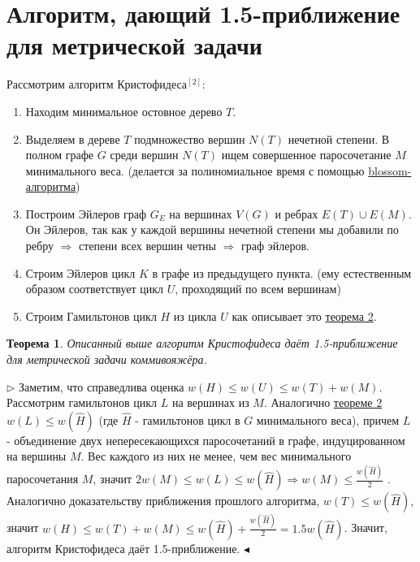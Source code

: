 \documentclass[14pt]{article}
\newtheorem{Th}{Теорема}
\newenvironment{PROOF}
{\par\noindent{\bf Доказательство:}\newline$\triangleright$}
{\hfill$\scriptstyle\blacktriangleleft$}
\begin{document}
	
	\section{Алгоритм, дающий 1.5-приближение для метрической задачи}
	
	Рассмотрим алгоритм Кристофидеса\hyperref[algoChrist]{$^{[2]}$}:
	
	\begin{enumerate}
		\item Находим минимальное остовное дерево $T$.
		\item Выделяем в дереве $T$ подмножество вершин $N(T)$ нечетной степени. В полном графе $G$ среди вершин $N(T)$ ищем совершенное паросочетание $M$ минимального веса. (делается за полиномиальное время с помощью \hyperref[kolm]{blossom-алгоритма})
		\item Построим Эйлеров граф $G_E$ на вершинах $V(G)$ и ребрах $E(T) \cup E(M)$. Он Эйлеров, так как у каждой вершины нечетной степени мы добавили по ребру $\Rightarrow$ степени всех вершин четны $\Rightarrow$ граф эйлеров.
		\item Строим Эйлеров цикл $K$ в графе из предыдущего пункта. (ему естественным образом соответствует цикл $U$, проходящий по всем вершинам)
		\item Строим Гамильтонов цикл $H$ из цикла $U$ как описывает это \hyperref[Th2]{теорема 2}.
	\end{enumerate}
	
	\begin{Th}
		Описанный выше алгоритм Кристофидеса даёт 1.5-приближение для метрической задачи коммивояжёра.	
	\end{Th}
	
	\begin{PROOF}
		Заметим, что справедлива оценка $w(H) \leq w(U) \leq w(T) + w(M)$. Рассмотрим гамильтонов цикл $L$ на вершинах из $M$. Аналогично \hyperref[Th2]{теореме 2} $w(L) \leq w(\hat{H})$ (где $\hat{H}$ - гамильтонов цикл в $G$ минимального веса), причем $L$ - объединение двух непересекающихся паросочетаний  в графе, индуцированном на вершины $M$. Вес каждого из них не менее, чем вес минимального паросочетания $M$, значит $2w(M) \leq w(L) \leq w(\hat{H}) \Rightarrow w(M) \leq \frac{w(\hat{H})}{2}$ . Аналогично доказательству приближения прошлого алгоритма, $w(T) \leq w(\hat{H})$, значит $w(H) \leq w(T) + w(M) \leq w(\hat{H}) + \frac{w(\hat{H})}{2} = 1.5w(\hat{H})$. Значит, алгоритм Кристофидеса даёт 1.5-приближение. 
	\end{PROOF}
\end{document}
